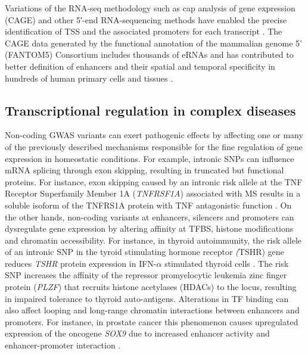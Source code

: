 Variations of the RNA-seq methodology such as cap analysis of gene expression (CAGE) and other 5′-end RNA-sequencing methods have enabled the precise identification of TSS and the associated promoters for each transcript  \parencite{Yamashita2011,FANTOM2014}. The CAGE data generated by the functional annotation of the mammalian genome 5' (FANTOM5) Consortium includes thousands of eRNAs and has contributed to better definition of enhancers and their spatial and temporal specificity in hundreds of human primary cells and tissues \parencite{Andersson2014}. %


\subsection{Transcriptional regulation in complex diseases}

Non-coding GWAS variants can exert pathogenic effects by affecting one or many of the previously described mechanisms responsible for the fine regulation of gene expression in homeostatic conditions. For example, intronic SNPs can influence mRNA splicing through exon skipping, resulting in truncated but functional proteins. For instance, exon skipping caused by an intronic risk allele at the TNF Receptor Superfamily Member 1A (\textit{TNFRSF1A}) associated with MS results in a soluble isoform of the TNFRS1A protein with TNF antagonistic function \parencite{Gregory2012}. On the other hands, non-coding variants at enhancers, silencers and promoters can dysregulate gene expression by altering affinity at TFBS, histone modifications and chromatin accessibility. For instance, in thyroid autoimmunity, the risk allele of an intronic SNP in the tyroid stimulating hormone receptor \textit(TSHR) gene reduces \textit{TSHR} protein expression in IFN-$\alpha$ stimulated thyroid cells \parencite{Stefan2014}. The risk SNP increases the affinity of the repressor promyelocytic leukemia zinc finger protein (\textit{PLZF}) that recruits histone acetylases (HDACs) to the locus, resulting in impaired tolerance to thyroid auto-antigens. Alterations in TF binding can also affect looping and long-range chromatin interactions between enhancers and promoters. For instance, in prostate cancer this phenomenon causes upregulated expression of the oncogene \textit{SOX9} due to increased enhancer activity and enhancer-promoter interaction \parencite{Zhang2012}. 

